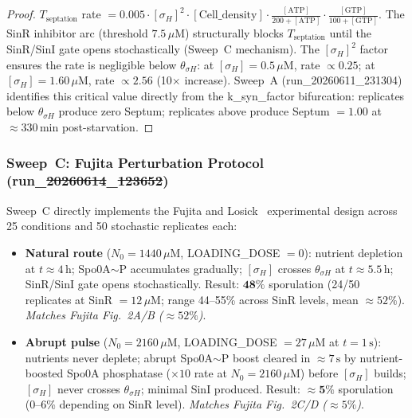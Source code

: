 \documentclass[10pt,letterpaper]{article}
\providecommand{\DIFaddtex}[1]{{\protect\color{blue}\uwave{#1}}} %
\providecommand{\DIFdeltex}[1]{{\protect\color{red}\sout{#1}}}                      %
\providecommand{\DIFaddbegin}{} %
\providecommand{\DIFaddend}{} %
\providecommand{\DIFdelbegin}{} %
\providecommand{\DIFdelend}{} %
\providecommand{\DIFadd}[1]{\texorpdfstring{\DIFaddtex{#1}}{#1}} %
\providecommand{\DIFdel}[1]{\texorpdfstring{\DIFdeltex{#1}}{}} %
\newcommand{\DIFscaledelfig}{0.5}
\newlength{\DIFdelgraphicswidth} %
\newlength{\DIFdelgraphicsheight} %
\newcommand{\DIFaddincludegraphics}[2][]{{\color{blue}\fbox{\DIFOincludegraphics[#1]{#2}}}} %
\newcommand{\DIFdelincludegraphics}[2][]{%
\sbox{\DIFdelgraphicsbox}{\DIFOincludegraphics[#1]{#2}}%
\settoboxwidth{\DIFdelgraphicswidth}{\DIFdelgraphicsbox} %
\settoboxtotalheight{\DIFdelgraphicsheight}{\DIFdelgraphicsbox} %
\scalebox{\DIFscaledelfig}{%
\parbox[b]{\DIFdelgraphicswidth}{\usebox{\DIFdelgraphicsbox}\\[-\baselineskip] \rule{\DIFdelgraphicswidth}{0em}}\llap{\resizebox{\DIFdelgraphicswidth}{\DIFdelgraphicsheight}{%
\setlength{\unitlength}{\DIFdelgraphicswidth}%
\begin{picture}(1,1)%
\thicklines\linethickness{2pt} %
{\color[rgb]{1,0,0}\put(0,0){\framebox(1,1){}}}%
{\color[rgb]{1,0,0}\put(0,0){\line( 1,1){1}}}%
{\color[rgb]{1,0,0}\put(0,1){\line(1,-1){1}}}%
\end{picture}%
}\hspace*{3pt}}} %
} %
\DeclareRobustCommand{\DIFaddbegin}{\DIFOaddbegin \let\includegraphics\DIFaddincludegraphics} %
\DeclareRobustCommand{\DIFaddend}{\DIFOaddend \let\includegraphics\DIFOincludegraphics} %
\DeclareRobustCommand{\DIFdelbegin}{\DIFOdelbegin \let\includegraphics\DIFdelincludegraphics} %
\DeclareRobustCommand{\DIFdelend}{\DIFOaddend \let\includegraphics\DIFOincludegraphics} %
\begin{document}
\begin{proof}
$T_{\mathrm{septation}}$ rate $= 0.005 \cdot [\sigma_H]^2 \cdot [\text{Cell\_density}] \cdot \frac{[\text{ATP}]}{200 + [\text{ATP}]} \cdot \frac{[\text{GTP}]}{100 + [\text{GTP}]}$.
The SinR inhibitor arc (threshold $7.5\,\mu$M) structurally blocks $T_{\mathrm{septation}}$ until the SinR/SinI gate opens stochastically (Sweep~C mechanism). The $[\sigma_H]^2$ factor ensures the rate is negligible below $\theta_{\sigma H}$: at $[\sigma_H] = 0.5\,\mu$M, rate $\propto 0.25$; at $[\sigma_H] = 1.60\,\mu$M, rate $\propto 2.56$ (10$\times$ increase). Sweep~A (run\_20260611\_231304) identifies this critical value directly from the k\_syn\_factor bifurcation: replicates below $\theta_{\sigma H}$ produce zero Septum; replicates above produce Septum $= 1.00$ at $\approx 330\,\text{min}$ post-starvation.
\end{proof}

\subsubsection{Sweep~C: Fujita Perturbation Protocol (run\_\DIFdelbegin \DIFdel{20260614}\DIFdelend \DIFaddbegin \DIFadd{20260719}\DIFaddend \_\DIFdelbegin \DIFdel{123652}\DIFdelend \DIFaddbegin \DIFadd{170034}\DIFaddend )}

Sweep~C directly implements the Fujita and Losick~\cite{fujita2005} experimental design across 25 conditions and 50 stochastic replicates each:

\begin{itemize}
\item \textbf{Natural route} ($N_0 = 1440\,\mu$M, LOADING\_DOSE $= 0$): nutrient depletion at $t \approx 4\,\text{h}$; Spo0A$\sim$P accumulates gradually; $[\sigma_H]$ crosses $\theta_{\sigma H}$ at $t \approx 5.5\,\text{h}$; SinR/SinI gate opens stochastically. Result: $\mathbf{48\%}$ sporulation (24/50 replicates at SinR $= 12\,\mu$M; range 44--55\% across SinR levels, mean $\approx 52\%$). \emph{Matches Fujita Fig.~2A/B ($\approx 52\%$)}.
\item \textbf{Abrupt pulse} ($N_0 = 2160\,\mu$M, LOADING\_DOSE $= 27\,\mu$M at $t = 1\,\text{s}$): nutrients never deplete; abrupt Spo0A$\sim$P boost cleared in $\approx 7\,\text{s}$ by nutrient-boosted Spo0A phosphatase ($\times 10$ rate at $N_0 = 2160\,\mu$M) before $[\sigma_H]$ builds; $[\sigma_H]$ never crosses $\theta_{\sigma H}$; minimal SinI produced. Result: $\mathbf{\approx 5\%}$ sporulation (0--6\% depending on SinR level). \emph{Matches Fujita Fig.~2C/D ($\approx 5\%$)}.
\end{itemize}
\end{document}
